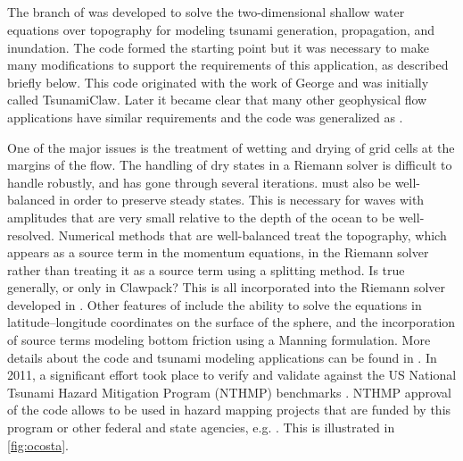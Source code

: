 %
%
%

\subsection{\geoclaw}

The \geoclaw branch of \clawpack was developed to solve the
two-dimensional shallow water equations over topography
for modeling tsunami generation, propagation, and inundation.
The \amrclaw code formed the starting point but it was necessary to make many
modifications to support the requirements of this application, as described
briefly below.  This code originated with the work of George
\cite{dgeorge:masters, dgeorge:phd, dgeorge:jcp}
and was initially called
{\sc TsunamiClaw}.  Later it became clear that many other
geophysical flow applications have similar requirements and the code was
generalized as \geoclaw.


One of the major issues is the treatment of wetting and
drying of grid cells at the margins of the flow. The handling of dry
states in a Riemann solver is difficult to handle robustly, and has gone
through several iterations.
\geoclaw must also be well-balanced in order to preserve steady states.
This is necessary for  waves with amplitudes that
are very small relative to the depth of the ocean to be  well-resolved.
Numerical methods that are well-balanced treat
the topography, which appears as a source term in the
momentum equations, in the Riemann solver rather than treating it as a
source term using a splitting method. \alert{Is true generally, or only in Clawpack?}
This is all incorporated into the Riemann solver developed in
\cite{dgeorge:phd, dgeorge:jcp}. Other features of
\geoclaw include the ability to solve the equations in latitude--longitude
coordinates on the surface of the sphere, and the incorporation of source terms
modeling bottom friction using a Manning formulation. More details about the
code and tsunami modeling applications can be found in
\cite{BergerGeorgeLeVequeMandli:awr11, LeVequeGeorgeBerger:an11}. In 2011, a
significant effort took place to verify and validate \geoclaw against the US
National Tsunami Hazard Mitigation Program (NTHMP) benchmarks
\cite{GonzalezLeVequeEtAl2011}.
NTHMP approval of the code allows \geoclaw to be used in hazard mapping
projects that are funded by this program or other federal and state agencies,
e.g.
\cite{GonzalezLeVequeEtAl2013a,GonzalezLeVequeEtAl2014}.
This is illustrated in \cref{fig:ocosta}.

